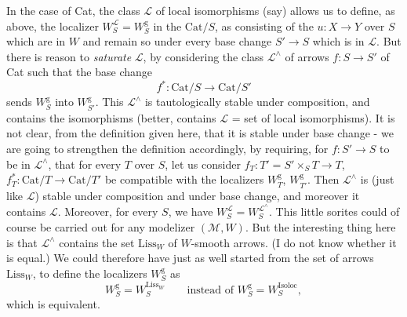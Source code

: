 In the case of Cat, the class $\mathcal{L}$ of local isomorphisms (say) allows us to define, as above, the localizer $W^{\mathcal{L}}_S = W^{\mathrm{g}}_S$ in the $\mathrm{Cat}/S$, as consisting of the $u : X \longrightarrow Y$ over $S$ which are in $W$ and remain so under every base change $S' \longrightarrow S$ which is in $\mathcal{L}$. But there is reason to \textit{saturate} $\mathcal{L}$, by considering the class $\mathcal{L}^\wedge$ of arrows $f : S \longrightarrow S'$ of Cat such that the base change
\[
f^* : \mathrm{Cat}/S \longrightarrow \mathrm{Cat}/S'
\]
sends $W^{\mathrm{g}}_S$ into $W^{\mathrm{g}}_{S'}$. This $\mathcal{L}^\wedge$ is tautologically stable under composition, and contains the isomorphisms (better, contains $\mathcal{L}$ = set of local isomorphisms). It is not
clear, from the definition given here, that it is stable under base change - we are going to strengthen the definition accordingly, by requiring, for $f : S' \longrightarrow S$ to be in $\mathcal{L}^\wedge$, that for every $T$ over $S$, let us consider $f_T : T' = S' \times_S T \longrightarrow T$, $f^*_T : \mathrm{Cat}/T \longrightarrow \mathrm{Cat}/T'$ be compatible with the localizers $W^{\mathrm{g}}_T$, $W^{\mathrm{g}}_{T'}$. Then $\mathcal{L}^\wedge$ is (just like $\mathcal{L}$) stable under composition and under base change, and moreover it contains $\mathcal{L}$. Moreover, for every $S$, we have $W^{\mathcal{L}}_S = W^{\mathcal{L}^\wedge}_S$. This little sorites could of course be carried out for any modelizer $(\mathcal{M},W)$. But the interesting thing here is that $\mathcal{L}^\wedge$ contains the set $\mathrm{Liss}_W$ of $W$-smooth arrows. (I do not know whether it is equal.) We could therefore have
just as well started from the set of arrows $\mathrm{Liss}_W$, to define the localizers $W^{\mathrm{g}}_S$ as
\[
W^{\mathrm{g}}_S = W^{\mathrm{Liss}_W}_S \qquad \text{instead of } W^{\mathrm{g}}_S = W^{\mathrm{Isoloc}}_S,
\]
which is equivalent.

